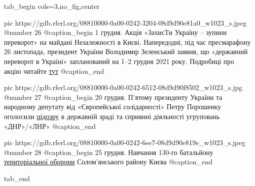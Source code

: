  
 
 
 
 


\ifcmt
  tab_begin cols=3,no_fig,center

     pic https://gdb.rferl.org/08810000-0a00-0242-3204-08d9d90e81a0_w1023_s.jpeg
		 @number 26
		 @caption_begin
1 грудня. Акція «ЗахисТи Україну – зупини переворот» на майдані Незалежності в
Києві.  Напередодні, під час пресмарафону 26 листопада, президент України
Володимир Зеленський заявив, що «державний переворот в Україні» запланований на
1–2 грудня 2021 року. Подробиці про акцію читайте \href{https://www.radiosvoboda.org/a/news-kyiv-aktsiia-protestu/31589251.html}{тут}
		 @caption_end

		 pic https://gdb.rferl.org/08810000-0a00-0242-6512-08d9d90f8502_w1023_s.jpg
		 @number 27
		 @caption_begin
20 грудня. П'ятому президенту України та народному депутату від «Європейської
солідарності» Петру Порошенку оголосили \href{https://www.radiosvoboda.org/a/zelensky-poroshenko-medvedchuk-rossiya-pidozra/31620761.html}{підозру} в державній зраді та сприянні
діяльності угруповань «ДНР»/«ЛНР» 
		 @caption_end

		 pic https://gdb.rferl.org/08810000-0a00-0242-6ee7-08d9d90e819e_w1023_s.jpeg
		 @number 28
		 @caption_begin
25 грудня. Навчання 130-го батальйону \href{https://www.radiosvoboda.org/a/foto-terytorialna-oborona-ukrainy/31631686.html}{територіальної оборони} Солом’янського району Києва 
		 @caption_end

  tab_end
\fi

